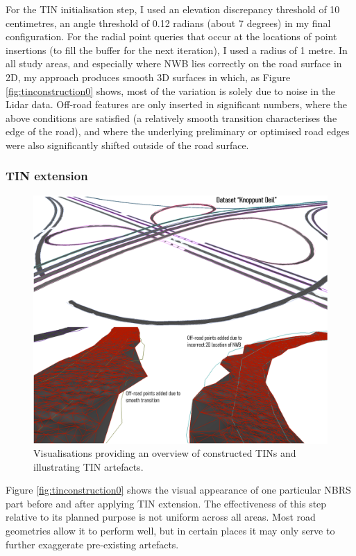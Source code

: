 For the TIN initialisation step, I used an elevation discrepancy threshold of 10 centimetres, an angle threshold of 0.12 radians (about 7 degrees) in my final configuration. For the radial point queries that occur at the locations of point insertions (to fill the buffer for the next iteration), I used a radius of 1 metre. In all study areas, and especially where NWB lies correctly on the road surface in 2D, my approach produces smooth 3D surfaces in which, as Figure \ref{fig:tinconstruction0} shows, most of the variation is solely due to noise in the Lidar data. Off-road features are only inserted in significant numbers, where the above conditions are satisfied (a relatively smooth transition characterises the edge of the road), and where the underlying preliminary or optimised road edges were also significantly shifted outside of the road surface.

\subsubsection{TIN extension}

\begin{figure}[]
    \centering
    \includegraphics[width=0.9\linewidth]{final_report/figs/tinconstruction1.png}
    \caption{Visualisations providing an overview of constructed TINs and illustrating TIN artefacts.}
    \label{fig:tinconstruction1}
\end{figure}

Figure \ref{fig:tinconstruction0} shows the visual appearance of one particular NBRS part before and after applying TIN extension. The effectiveness of this step relative to its planned purpose is not uniform across all areas. Most road geometries allow it to perform well, but in certain places it may only serve to further exaggerate pre-existing artefacts.

